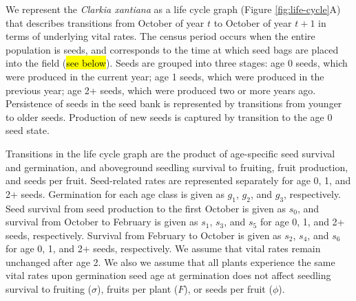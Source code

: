 \documentclass[12pt, oneside, titlepage]{article}   	%
\begin{document}
{

We represent the \textit{Clarkia xantiana} as a life cycle graph (Figure \ref{fig:life-cycle}A) that describes transitions from October of year $t$ to October of year $t+1$ in terms of underlying vital rates. The census period occurs when the entire population is seeds, and corresponds to the time at which seed bags are placed into the field (\hl{see below}). Seeds are grouped into three stages: age 0 seeds, which were produced in the current year; age 1 seeds, which were produced in the previous year; age 2+ seeds, which were produced two or more years ago. Persistence of seeds in the seed bank is represented by transitions from younger to older seeds. Production of new seeds is captured by transition to the age 0 seed state. 

Transitions in the life cycle graph are the product of age-specific seed survival and germination, and aboveground seedling survival to fruiting, fruit production, and seeds per fruit. Seed-related rates are represented separately for age 0, 1, and 2+ seeds. Germination for each age class is given as $g_1$, $g_2$, and $g_3$, respectively. Seed survival from seed production to the first October is given as $s_0$, and survival from October to February is given as $s_1$, $s_3$, and $s_5$ for age 0, 1, and 2+ seeds, respectively. Survival from February to October is given as $s_2$, $s_4$, and $s_6$ for age 0, 1, and 2+ seeds, respectively. We assume that vital rates remain unchanged after age 2. We also we assume that all plants experience the same vital rates upon germination seed age at germination does not affect seedling survival to fruiting ($\sigma$), fruits per plant ($F$), or seeds per fruit ($\phi$).

}
\end{document}
